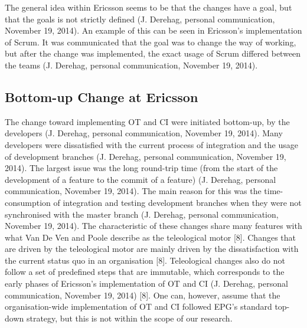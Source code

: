 \documentclass[final_report_innit.tex]{subfiles}
\begin{document}
The general idea within Ericsson seems to be that the changes have a goal, but that the goals is not strictly defined (J. Derehag, personal communication, November 19, 2014). An example of this can be seen in Ericsson’s implementation of Scrum. It was communicated that the goal was to change the way of working, but after the change was implemented, the exact usage of Scrum differed between the teams (J. Derehag, personal communication, November 19, 2014). 

\subsection*{Bottom-up Change at Ericsson}
The change toward implementing OT and CI were initiated bottom-up, by the developers (J. Derehag, personal communication, November 19, 2014). Many developers were dissatisfied with the current process of integration and the usage of development branches (J. Derehag, personal communication, November 19, 2014). The largest issue was the long round-trip time (from the start of the development of a feature to the commit of a feature) (J. Derehag, personal communication, November 19, 2014). The main reason for this was the time-consumption of integration and testing development branches when they were not synchronised with the master branch (J. Derehag, personal communication, November 19, 2014). The characteristic of these changes share many features with what Van De Ven and Poole describe as the teleological motor [8]. Changes that are driven by the teleological motor are mainly driven by the dissatisfaction with the current status quo in an organisation [8]. Teleological changes also do not follow a set of predefined steps that are immutable, which corresponds to the early phases of Ericsson’s implementation of OT and CI (J. Derehag, personal communication, November 19, 2014) [8]. One can, however, assume that the organisation-wide implementation of OT and CI followed EPG’s standard top-down strategy, but this is not within the scope of our research.
\end{document}
